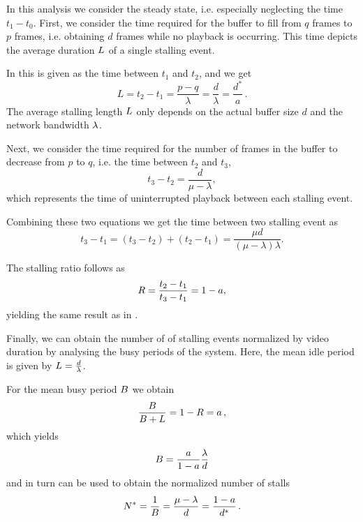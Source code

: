 In this analysis we consider the steady state, i.e. especially neglecting the time \(t_1 - t_0\).
First, we consider the time required for the buffer to fill from \(q\) frames to \(p\) frames, i.e. obtaining \(d\) frames while no playback is occurring.
This time depicts the average duration \(L\) of a single stalling event.

In  this is given as the time between \(t_1\) and \(t_2\), and we get
\begin{equation}
L=t_2-t_1 = \frac{p-q}{\lambda}=\frac{d}{\lambda} = \frac{d^*}{a}\, .
\label{eq:application:qoe_user_behaviour:system_model:steady_state:mean_stalling_event}
\end{equation}
The average stalling length \(L\) only depends on the actual buffer size \(d\) and the network bandwidth \(\lambda\).

Next, we consider the time required for the number of frames in the buffer to decrease from \(p\) 
to \(q\), i.e. the time between \(t_2\) and \(t_3\), 
\[t_3-t_2 = \frac{d}{\mu-\lambda},\]
which represents the time of uninterrupted playback between each stalling event.

Combining these two equations we get the time between two stalling event as
\[
t_3-t_1=(t_3-t_2)+(t_2-t_1)=\frac{\mu d}{(\mu-\lambda)\lambda}.
\]

The stalling ratio \stallingRatio follows as
\begin{equation}
R = \frac{t_2-t_1}{t_3-t_1} = 1-a,
\label{eq:application:qoe_user_behaviour:system_model:steady_state:stalling_ratio}
\end{equation}
yielding the same result as in .

Finally, we can obtain the number of of stalling events normalized by video duration by analysing the busy periods of the system.
Here, the mean idle period is given by \(L = \frac{d}{\lambda}\).

For the mean busy period \(B\) we obtain
\[
\frac{B}{B + L} = 1 - R = a \, ,
\]
which yields
\[
B = \frac{a}{1-a}\frac{\lambda}{d} 
\]
and in turn can be used to obtain the normalized number of stalls 
\begin{equation}
N^* = \frac{1}{B}=\frac{\mu-\lambda}{d} = \frac{1-a}{d^*}\, .
\label{eq:application:qoe_user_behaviour:system_model:steady_state:normalized_number_of_stalls}
\end{equation}

